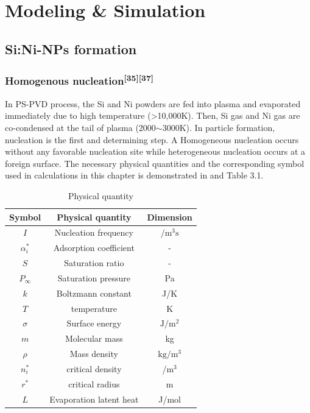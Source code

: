 \chapter{Modeling \& Simulation}
\section{Si:Ni-NPs formation }
\subsection{Homogenous nucleation\textsuperscript{[35][37]}}
In PS-PVD process, the Si and Ni powders are fed into plasma and evaporated immediately due to high temperature (>10,000K). Then, Si gas and Ni gas are co-condensed at the tail of plasma (2000$\sim$3000K). In particle formation, nucleation is the first and determining step. A Homogeneous nucleation occurs without any favorable nucleation site while heterogeneous nucleation occurs at a foreign surface. The necessary  physical quantities  and the corresponding symbol used in calculations in this chapter is demonstrated in and Table 3.1.
\begin{table}[h]
\caption{Physical quantity}
\centering
\begin{tabular}{ccc}
\toprule
Symbol & Physical quantity      & Dimension \\
\midrule
$I$    & Nucleation   frequency & $\mathrm{/m^{3}s}$    \\
$\alpha _{i}^{\ast }$ & Adsorption coefficient & -         \\
$S$  & Saturation ratio       & -         \\
$P_{\infty }$ & Saturation pressure    & Pa \\
 $k$ & Boltzmann constant     & J/K       \\
$T$  & temperature            & K         \\
 $\sigma $  & Surface energy   & $\mathrm{J/m^{2}}$\\
$m$ & Molecular mass         & kg        \\
$\rho $& Mass density           & $\mathrm{kg/m^{3}}$     \\
$n_{i}^{\ast }$ & critical density & /$\mathrm{m^{3}}$ \\
$r^{\ast }$ & critical radius & m \\
$L$ & Evaporation latent heat & J/mol \\
\bottomrule
\end{tabular}
\end{table}

